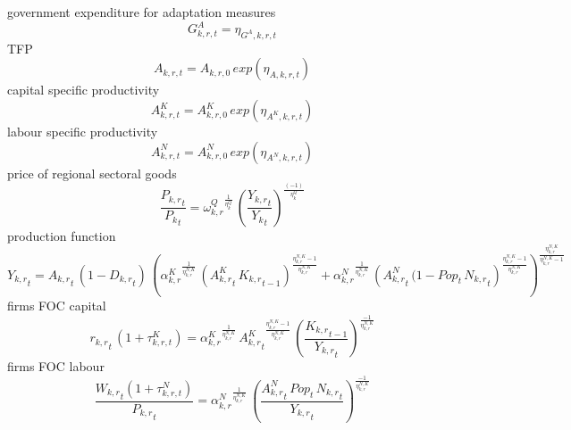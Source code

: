 government expenditure for adaptation measures
\begin{dmath}
G^{A}_{k,r,t}=\eta_{G^{A},k,r,t}
\end{dmath}
TFP
\begin{dmath}
A_{k,r,t}= A_{k,r,0} \, exp\left({\eta_{A,k,r,t}}\right)
\end{dmath}
capital specific productivity
\begin{dmath}
A^{K}_{k,r,t}= A^{K}_{k,r,0} \, exp\left({\eta_{A^{K},k,r,t}}\right)
\end{dmath}
labour specific productivity
\begin{dmath}
A^{N}_{k,r,t}= A^{N}_{k,r,0} \, exp\left({\eta_{A^{N},k,r,t}}\right)
\end{dmath}
price of regional sectoral goods
\begin{dmath}
\frac{{{P_{k,r}}_{t}}}{{{P_k}_{t}}}={{\omega^{Q}_{k,r}}}^{\frac{1}{{{\eta^{Q}_{k}}}}}\, \left(\frac{{{Y_{k,r}}_{t}}}{{{Y_k}_{t}}}\right)^{\frac{\left(-1\right)}{{{\eta^{Q}_{k}}}}}
\end{dmath}
production function
\begin{dmath}
{{Y_{k,r}}_{t}}={{A_{k,r}}_{t}}\, \left(1-{{D_{k,r}}_{t}}\right)\, \left({{\alpha^{K}_{k,r}}}^{\frac{1}{{{\eta^{N,K}_{k,r}}}}}\, \left({{A^{K}_{k,r}}_{t}}\, {{K_{k,r}}_{t-1}}\right)^{\frac{{{\eta^{N,K}_{k,r}}}-1}{{{\eta^{N,K}_{k,r}}}}}+{{\alpha^{N}_{k,r}}}^{\frac{1}{{{\eta^{N,K}_{k,r}}}}}\, \left({{A^{N}_{k,r}}_{t}}\, (1 -  {Pop_{t}}\, {{N_{k,r}}_{t}}\right)^{\frac{{{\eta^{N,K}_{k,r}}}-1}{{{\eta^{N,K}_{k,r}}}}}\right)^{\frac{{{\eta^{N,K}_{k,r}}}}{{{\eta^{N,K}_{k,r}}}-1}}
\end{dmath}
firms FOC capital
\begin{dmath}
{{r_{k,r}}_{t}} \, \left(1+\tau^{K}_{k,r,t}\right)={{\alpha^{K}_{k,r}}}^{\frac{1}{{{\eta^{N,K}_{k,r}}}}}\, {{A^{K}_{k,r}}_{t}}^{\frac{{{\eta^{N,K}_{k,r}}}-1}{{{\eta^{N,K}_{k,r}}}}}\, \left(\frac{{{K_{k,r}}_{t-1}}}{{{Y_{k,r}}_{t}}}\right)^{\frac{-1}{{{\eta^{N,K}_{k,r}}}}}
\end{dmath}
firms FOC labour
\begin{dmath}
\frac{{{W_{k,r}}_{t}}\left(1+\tau^{N}_{k,r,t}\right)}{{{P_{k,r}}_{t}}}={{\alpha^{N}_{k,r}}}^{\frac{1}{{{\eta^{N,K}_{k,r}}}}}\, \left(\frac{{{A^{N}_{k,r}}_{t}}\, {Pop_{t}}\, {{N_{k,r}}_{t}}}{{{Y_{k,r}}_{t}}}\right)^{\frac{-1}{{{\eta^{N,K}_{k,r}}}}}
\end{dmath}

